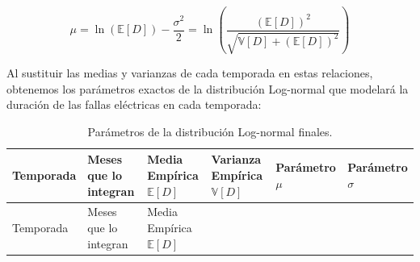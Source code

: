 \documentclass[
  spanish,
  letterpaper,
  DIV=11,
  numbers=noendperiod]{scrreprt}
\theoremstyle{plain}
\theoremstyle{definition}
\theoremstyle{remark}
\begin{document}
\[
\mu = \ln(\mathbb{E}[D]) - \frac{\sigma^2}{2} = \ln\left( \frac{(\mathbb{E}[D])^2}{\sqrt{\mathbb{V}[D] + (\mathbb{E}[D])^2}} \right)
\]

Al sustituir las medias y varianzas de cada temporada en estas
relaciones, obtenemos los parámetros exactos de la distribución
Log-normal que modelará la duración de las fallas eléctricas en cada
temporada:

\begin{longtable}[]{@{}
  >{\raggedright\arraybackslash}p{}
  >{\centering\arraybackslash}p{}
  >{\centering\arraybackslash}p{}
  >{\centering\arraybackslash}p{}
  >{\centering\arraybackslash}p{}
  >{\centering\arraybackslash}p{}@{}}
\caption{Parámetros de la distribución Log-normal
finales.}\label{tbl-parametros-lognormal}\tabularnewline
\toprule\noalign{}
\begin{minipage}[b]{\linewidth}\raggedright
Temporada
\end{minipage} & \begin{minipage}[b]{\linewidth}\centering
Meses que lo integran
\end{minipage} & \begin{minipage}[b]{\linewidth}\centering
Media Empírica \(\mathbb{E}[D]\)
\end{minipage} & \begin{minipage}[b]{\linewidth}\centering
Varianza Empírica \(\mathbb{V}[D]\)
\end{minipage} & \begin{minipage}[b]{\linewidth}\centering
Parámetro \(\mu\)
\end{minipage} & \begin{minipage}[b]{\linewidth}\centering
Parámetro \(\sigma\)
\end{minipage} \\
\midrule\noalign{}
\endfirsthead
\toprule\noalign{}
\begin{minipage}[b]{\linewidth}\raggedright
Temporada
\end{minipage} & \begin{minipage}[b]{\linewidth}\centering
Meses que lo integran
\end{minipage} & \begin{minipage}[b]{\linewidth}\centering
Media Empírica \(\mathbb{E}[D]\)
\end{minipage} & \begin{minipage}[b]{\linewidth}\centering

\end{minipage}
\end{longtable}
\end{document}
